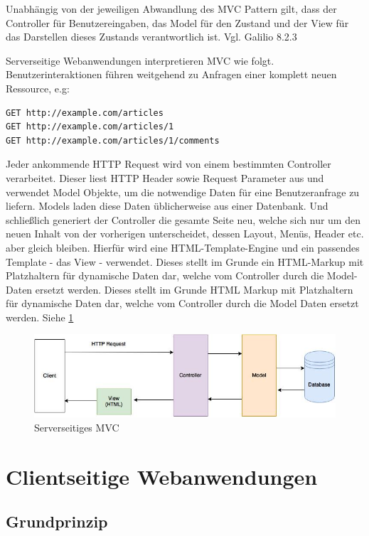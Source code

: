 Unabhängig von der jeweiligen Abwandlung des MVC Pattern gilt, dass der Controller für Benutzereingaben, das Model für den Zustand und der View für das Darstellen dieses Zustands verantwortlich ist. Vgl. Galilio  8.2.3

Serverseitige Webanwendungen interpretieren MVC wie folgt. Benutzerinteraktionen führen weitgehend zu Anfragen einer komplett neuen Ressource, e.g:

\begin{verbatim}
GET http://example.com/articles
GET http://example.com/articles/1
GET http://example.com/articles/1/comments
\end{verbatim}

Jeder ankommende HTTP Request wird von einem bestimmten Controller verarbeitet. Dieser liest HTTP Header sowie Request Parameter aus und verwendet Model Objekte, um die notwendige Daten für eine Benutzeranfrage zu liefern. Models laden diese Daten üblicherweise aus einer Datenbank. Und schließlich generiert der Controller die gesamte Seite neu, welche sich nur um den neuen Inhalt von der vorherigen unterscheidet, dessen Layout, Menüs, Header etc. aber gleich bleiben. Hierfür wird eine HTML-Template-Engine und ein passendes Template - das View - verwendet. Dieses stellt im Grunde ein HTML-Markup mit Platzhaltern für dynamische Daten dar, welche vom Controller durch die Model-Daten ersetzt werden. Dieses stellt im Grunde HTML Markup mit Platzhaltern für dynamische Daten dar, welche vom Controller durch die Model Daten ersetzt werden. Siehe \ref{fig:server_side_mvc}

\begin{figure}[htp]     %
\centering
\includegraphics[width=1.0\textwidth]{images/server_side_mvc} 
\caption{Serverseitiges MVC}\label{fig:server_side_mvc}
\end{figure}

\section{Clientseitige Webanwendungen}

\subsection{Grundprinzip}

